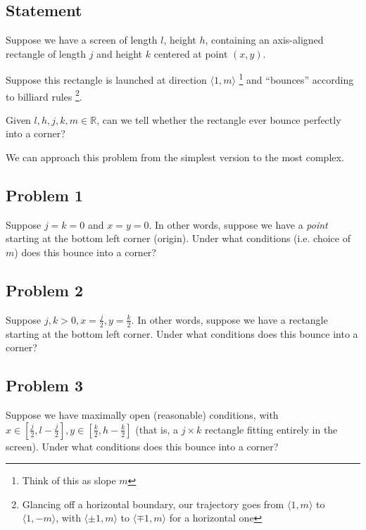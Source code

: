 \documentclass[11pt, oneside]{article} 	%
\begin{document}
\subsection{Statement} 
Suppose we have a screen of length $l$, height $h$, containing an axis-aligned rectangle of length $j$ and height $k$ centered at point $(x, y)$.

Suppose this rectangle is launched at direction $\langle 1, m\rangle$ \footnote {Think of this as slope $m$} and ``bounces'' according to billiard rules \footnote{Glancing off a horizontal boundary, our trajectory goes from $\langle 1, m \rangle$ to $\langle 1, -m \rangle$, with $\langle \pm 1, m \rangle$ to $\langle \mp 1, m \rangle$ for a horizontal one}.

Given $l, h, j, k, m \in \mathbb{R}$, can we tell whether the rectangle ever bounce perfectly into a corner?  

We can approach this problem from the simplest version to the most complex.

\subsection{Problem 1} 

Suppose $j = k = 0$ and $x = y = 0$. In other words, suppose we have a \emph{point} starting at the bottom left corner
 (origin).  Under what conditions (i.e. choice of $m$) does this bounce into a corner?


\subsection{Problem 2} 

Suppose $j, k > 0, x = \frac{j}{2}, y = \frac{k}{2}$. In other words, suppose we have a rectangle starting at the bottom left corner. Under what conditions does this bounce into a corner?

\subsection{Problem 3} 

Suppose we have maximally open (reasonable) conditions, with $x \in [\frac{j}{2}, l - \frac{j}{2}], y \in [\frac{k}{2}, h - \frac{k}{2}]$ (that is, a $j \times k$ rectangle fitting entirely in the screen). Under what conditions does this bounce into a corner?
\end{document}
